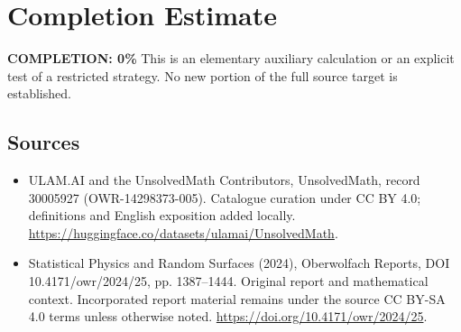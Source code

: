 \documentclass[11pt]{article}
\begin{document}
\section{Completion Estimate}
\noindent\textbf{COMPLETION: 0\%}
This is an elementary auxiliary calculation or an explicit test of a restricted strategy. No new portion of the full source target is established.

\subsection{Sources}
\begin{itemize}
\item[\hypertarget{source:30005927:1}{S1}] ULAM.AI and the UnsolvedMath Contributors, UnsolvedMath, record 30005927 (OWR-14298373-005). Catalogue curation under CC BY 4.0; definitions and English exposition added locally.
\url{https://huggingface.co/datasets/ulamai/UnsolvedMath}.
\item[\hypertarget{source:30005927:2}{S2}] Statistical Physics and Random Surfaces (2024), Oberwolfach Reports, DOI 10.4171/owr/2024/25, pp. 1387--1444. Original report and mathematical context. Incorporated report material remains under the source CC BY-SA 4.0 terms unless otherwise noted.
\url{https://doi.org/10.4171/owr/2024/25}.
\end{itemize}
\label{end:30005927}
\end{document}

